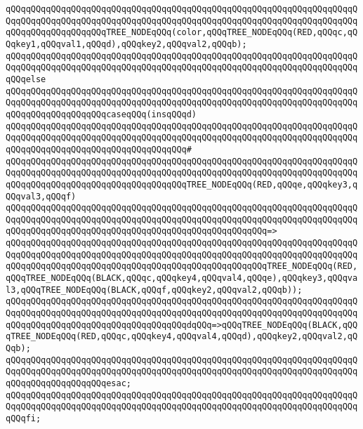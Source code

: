 \verb|qQQqqQQqqQQqqQQqqQQqqQQqqQQqqQQqqQQqqQQqqQQqqQQqqQQqqQQqqQQqqQQqqQQqqQQqqQQqqQQqqQQqqQQqqQQqqQQqqQQqqQQqqQQqqQQqqQQqqQQqqQQqqQQqqQQqqQQqqQQqqQQqqQQqqQQqqQQqqQQqTREE_NODEqQQq(color,qQQqTREE_NODEqQQq(RED,qQQqc,qQQqkey1,qQQqval1,qQQqd),qQQqkey2,qQQqval2,qQQqb);|\newline
\verb|qQQqqQQqqQQqqQQqqQQqqQQqqQQqqQQqqQQqqQQqqQQqqQQqqQQqqQQqqQQqqQQqqQQqqQQqqQQqqQQqqQQqqQQqqQQqqQQqqQQqqQQqqQQqqQQqqQQqqQQqqQQqqQQqqQQqqQQqqQQqqQQqelse|\newline
\verb|qQQqqQQqqQQqqQQqqQQqqQQqqQQqqQQqqQQqqQQqqQQqqQQqqQQqqQQqqQQqqQQqqQQqqQQqqQQqqQQqqQQqqQQqqQQqqQQqqQQqqQQqqQQqqQQqqQQqqQQqqQQqqQQqqQQqqQQqqQQqqQQqqQQqqQQqqQQqqQQqcaseqQQq(insqQQqd)|\newline
\verb|qQQqqQQqqQQqqQQqqQQqqQQqqQQqqQQqqQQqqQQqqQQqqQQqqQQqqQQqqQQqqQQqqQQqqQQqqQQqqQQqqQQqqQQqqQQqqQQqqQQqqQQqqQQqqQQqqQQqqQQqqQQqqQQqqQQqqQQqqQQqqQQqqQQqqQQqqQQqqQQqqQQqqQQqqQQqqQQq#|\newline
\verb|qQQqqQQqqQQqqQQqqQQqqQQqqQQqqQQqqQQqqQQqqQQqqQQqqQQqqQQqqQQqqQQqqQQqqQQqqQQqqQQqqQQqqQQqqQQqqQQqqQQqqQQqqQQqqQQqqQQqqQQqqQQqqQQqqQQqqQQqqQQqqQQqqQQqqQQqqQQqqQQqqQQqqQQqqQQqqQQqTREE_NODEqQQq(RED,qQQqe,qQQqkey3,qQQqval3,qQQqf)|\newline
\verb|qQQqqQQqqQQqqQQqqQQqqQQqqQQqqQQqqQQqqQQqqQQqqQQqqQQqqQQqqQQqqQQqqQQqqQQqqQQqqQQqqQQqqQQqqQQqqQQqqQQqqQQqqQQqqQQqqQQqqQQqqQQqqQQqqQQqqQQqqQQqqQQqqQQqqQQqqQQqqQQqqQQqqQQqqQQqqQQqqQQqqQQqqQQqqQQq=>|\newline
\verb|qQQqqQQqqQQqqQQqqQQqqQQqqQQqqQQqqQQqqQQqqQQqqQQqqQQqqQQqqQQqqQQqqQQqqQQqqQQqqQQqqQQqqQQqqQQqqQQqqQQqqQQqqQQqqQQqqQQqqQQqqQQqqQQqqQQqqQQqqQQqqQQqqQQqqQQqqQQqqQQqqQQqqQQqqQQqqQQqqQQqqQQqqQQqqQQqTREE_NODEqQQq(RED,qQQqTREE_NODEqQQq(BLACK,qQQqc,qQQqkey4,qQQqval4,qQQqe),qQQqkey3,qQQqval3,qQQqTREE_NODEqQQq(BLACK,qQQqf,qQQqkey2,qQQqval2,qQQqb));|\newline
\newline
\verb|qQQqqQQqqQQqqQQqqQQqqQQqqQQqqQQqqQQqqQQqqQQqqQQqqQQqqQQqqQQqqQQqqQQqqQQqqQQqqQQqqQQqqQQqqQQqqQQqqQQqqQQqqQQqqQQqqQQqqQQqqQQqqQQqqQQqqQQqqQQqqQQqqQQqqQQqqQQqqQQqqQQqqQQqqQQqqQQqdqQQq=>qQQqTREE_NODEqQQq(BLACK,qQQqTREE_NODEqQQq(RED,qQQqc,qQQqkey4,qQQqval4,qQQqd),qQQqkey2,qQQqval2,qQQqb);|\newline
\verb|qQQqqQQqqQQqqQQqqQQqqQQqqQQqqQQqqQQqqQQqqQQqqQQqqQQqqQQqqQQqqQQqqQQqqQQqqQQqqQQqqQQqqQQqqQQqqQQqqQQqqQQqqQQqqQQqqQQqqQQqqQQqqQQqqQQqqQQqqQQqqQQqqQQqqQQqqQQqqQQqesac;|\newline
\verb|qQQqqQQqqQQqqQQqqQQqqQQqqQQqqQQqqQQqqQQqqQQqqQQqqQQqqQQqqQQqqQQqqQQqqQQqqQQqqQQqqQQqqQQqqQQqqQQqqQQqqQQqqQQqqQQqqQQqqQQqqQQqqQQqqQQqqQQqqQQqqQQqfi;|\newline
